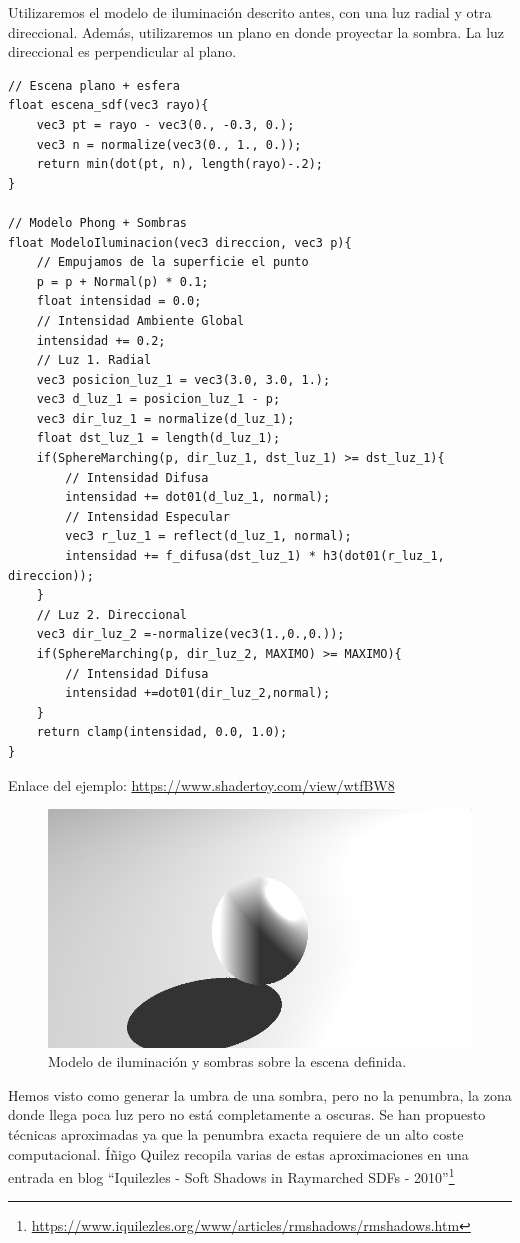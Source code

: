 Utilizaremos el modelo de iluminación descrito antes, con una luz radial y otra direccional. Además, utilizaremos un plano en donde proyectar la sombra. La luz direccional es perpendicular al plano.\\
\begin{lstlisting}
// Escena plano + esfera
float escena_sdf(vec3 rayo){
    vec3 pt = rayo - vec3(0., -0.3, 0.);
    vec3 n = normalize(vec3(0., 1., 0.));
    return min(dot(pt, n), length(rayo)-.2);
}

// Modelo Phong + Sombras
float ModeloIluminacion(vec3 direccion, vec3 p){
    // Empujamos de la superficie el punto 
    p = p + Normal(p) * 0.1;
    float intensidad = 0.0;
    // Intensidad Ambiente Global
    intensidad += 0.2;
    // Luz 1. Radial
    vec3 posicion_luz_1 = vec3(3.0, 3.0, 1.);
    vec3 d_luz_1 = posicion_luz_1 - p;
    vec3 dir_luz_1 = normalize(d_luz_1);
    float dst_luz_1 = length(d_luz_1);
    if(SphereMarching(p, dir_luz_1, dst_luz_1) >= dst_luz_1){
        // Intensidad Difusa
        intensidad += dot01(d_luz_1, normal);
        // Intensidad Especular
        vec3 r_luz_1 = reflect(d_luz_1, normal);
        intensidad += f_difusa(dst_luz_1) * h3(dot01(r_luz_1, direccion));
    }
    // Luz 2. Direccional
    vec3 dir_luz_2 =-normalize(vec3(1.,0.,0.));
    if(SphereMarching(p, dir_luz_2, MAXIMO) >= MAXIMO){
        // Intensidad Difusa
        intensidad +=dot01(dir_luz_2,normal);
    }
    return clamp(intensidad, 0.0, 1.0);
}
\end{lstlisting}

Enlace del ejemplo: \url{https://www.shadertoy.com/view/wtfBW8}

\begin{figure}[H]
  \centering
  \captionsetup{justification=centering}%
  \includegraphics[width=1.0\textwidth]{secciones/imagenes/lightmodel/sombra_dura.png}
  \caption{Modelo de iluminación y sombras sobre la escena definida.}
  \label{fig:shadow}
\end{figure}

Hemos visto como generar la umbra de una sombra, pero no la penumbra, la zona donde llega poca luz pero no está completamente a oscuras. Se han propuesto técnicas aproximadas ya que la penumbra exacta requiere de un alto coste computacional. Íñigo Quilez recopila varias de estas aproximaciones en una entrada en blog
\enquote{Iquilezles - Soft Shadows in Raymarched SDFs - 2010}\footnote{\url{https://www.iquilezles.org/www/articles/rmshadows/rmshadows.htm}}


\newpage
